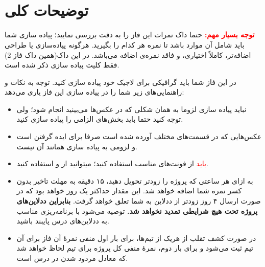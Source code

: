 \documentclass[]{article}
\begin{document}
\newpage
\pagestyle{fancy}
\fancyhf{}
\fancyfoot{}
\cfoot{\thepage}
\renewcommand{\headrulewidth}{2pt}

\KashidaOff



\tableofcontents

\newpage

 \Large \textbf{\\\\
}


\section*{{\titr توضیحات کلی}}

\textbf{\textcolor{red}{توجه بسیار مهم:}}
حتما داک نمرات این فاز را به دقت بررسی نمایید؛ پیاده سازی شما باید شامل آن موارد باشد تا نمره هر کدام را بگیرید. هرگونه پیاده‌سازی یا طراحی اضافه‌تر، کاملاً اختیاری، و فاقد نمره‌ی اضافه می‌باشد. در این داک(همین داک فاز 2) فقط کلیت پیاده سازی ذکر شده است.

در این فاز شما باید گرافیکی برای لاجیک خود پیاده سازی کنید. توجه به نکات و راهنمایی‌های زیر شما را در پیاده سازی این فاز یاری می‌دهد:


\begin{itemize}
\item
نباید پیاده سازی لزوما به همان شکلی که در عکس‌ها می‌بینید انجام شود؛ ولی توجه کنید حتما باید بخش‌های الزامی را پیاده سازی کنید.

\item
عکس‌هایی که در قسمت‌های مختلف آورده شده است صرفا برای ایده گرفتن است و لزومی به پیاده سازی همانند آن نیست.


\item
\textcolor{red}{باید}
 از فونت‌های مناسب استفاده کنید؛ میتوانید از
   \href{https://www.kenney.nl/assets/kenney-fonts}{\textcolor{blue}{\underline{}}}
    و
     \href{https://www.behance.net/collection/4860923/Free-Fonts}{\textcolor{blue}{\underline{}}}
    استفاده کنید.

\item

به ازای هر ساعتی که پروژه را زودتر تحویل دهید، ۱۵ دقیقه به مهلت تاخیر بدون کسر نمره شما اضافه خواهد‌ شد. این مقدار حداکثر یک روز خواهد‌ بود که در صورت ارسال ۴ روز زودتر از ددلاین به شما تعلق خواهد گرفت. \textbf{بنابراین ددلاین‌های پروژه تحت هیچ شرایطی تمدید نخواهد‌ شد.} توصیه می‌شود با برنامه‌ریزی مناسب به ددلاین‌های درس پایبند باشید.

\item
در صورت کشف تقلب از هریک از تیم‌ها، برای بار اول منفی نمرهٔ آن فاز برای آن تیم ثبت می‌شود و برای بار دوم، نمرهٔ منفی کل پروژه برای تیم لحاظ خواهد‌ شد که معادل مردود شدن در درس است.
\end{itemize}
\end{document}
